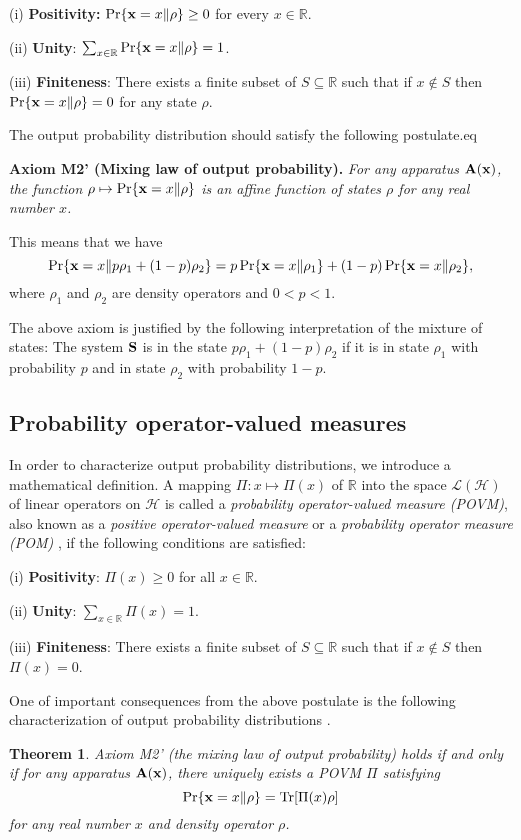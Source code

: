 \documentclass[graybox]{svmult}
\newcommand{\eeq}{\end{equation}}
\newcommand{\beql}[1]{\begin{equation}\label{eq:#1}}
\newcommand{\bA}{{\bf A}}
\newcommand{\bS}{{\bf S}}
\newcommand{\cH}{{\mathcal H}}
\newcommand{\cL}{{\mathcal L}}
\newcommand{\rh}{\rho}
\newcommand{\Tr}{\mbox{\rm Tr}}
\newcommand{\bx}{{\bf x}}
\newtheorem{Theorem}{Theorem}
\newcommand{\R}{\mathbb{R}}
\begin{document}
(i) {\bf Positivity:} $\Pr\{\bx=x\|\rh\}\ge0$ for every $x\in\R$.

(ii) {\bf Unity}: $\sum_{x\in\R}\Pr\{\bx=x\|\rh\}=1$.

(iii) {\bf Finiteness}: There exists a finite subset of $S\subseteq\R$
such that if $x\not\in S$ then $\Pr\{\bx=x\|\rh\}=0$
for any state $\rh$.

The output probability distribution should satisfy the following
postulate.eq
\bigskip

{\bf Axiom M2' (Mixing law of output probability).}
{\em For any apparatus $\bA(\bx)$, the
function $\rh\mapsto\Pr\{\bx=x\|\rh\}$ is
an affine function of states $\rh$ for any real number $x$.}
\bigskip

This means that we have 
$$
\Pr\{\bx=x\|p\rh_{1}+(1-p)\rh_{2}\}
=p\Pr\{\bx=x\|\rh_{1}\}+(1-p)\Pr\{\bx=x\|\rh_{2}\},
$$
where $\rh_{1}$ and $\rh_{2}$ are density operators and $0<p<1$. 

The above axiom is justified by the following interpretation of
the mixture of states:  The system $\bS$ is in the state
$p\rh_{1}+(1-p)\rh_{2}$ if  it is in state $\rh_{1}$ with
probability $p$ and in state $\rh_{2}$ with probability $1-p$.

\subsection{Probability operator-valued measures}

In order to characterize output probability distributions, we introduce a mathematical
definition.  A mapping $\Pi:x \mapsto \Pi(x)$ 
of $\R$ into the space  $\cL(\cH)$ of linear operators on 
$\cH$ is called a
{\em probability operator-valued measure (POVM)}, also known as a {\em
positive operator-valued measure} or a {\em probability operator measure (POM)}
\cite{Hel76}, if the following conditions are satisfied: 

(i) {\bf Positivity}: $\Pi(x)\ge 0$ for all
$x\in\R$. 

(ii) {\bf Unity}: $\sum_{x\in\R}\Pi(x)=1$. 

(iii) {\bf Finiteness}: There exists a finite subset of $S\subseteq\R$
such that if $x\not\in S$ then $\Pi(x)=0$.

One of important consequences from the above postulate is
the following characterization of output probability 
distributions \cite{80OG}.

\begin{Theorem}\label{th:POVM}
Axiom M2' (the mixing law of output probability) holds if and only if
for any apparatus $\bA(\bx)$, there  uniquely exists  a 
POVM $\Pi$ satisfying
\beql{Born-POVM}
\Pr\{\bx=x\|\rh\}
=
\Tr[\Pi(x)\rh]
\eeq
for any real number $x$ and  density operator $\rh$.
\end{Theorem}
\end{document}
